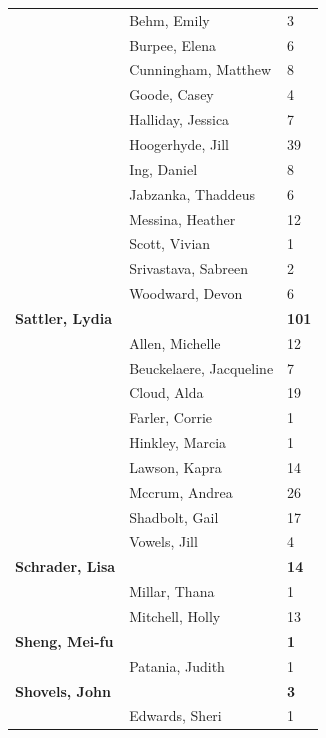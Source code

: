 \documentclass{article}\usepackage[]{graphicx}\usepackage[]{color}
\begin{document}
{\begin{longtable} { >{\raggedright}p{}|p{}p{}}
   \rowcolor[gray]{0.90} & Behm, Emily & 3 \\ 
   \rowcolor[gray]{0.90} & Burpee, Elena & 6 \\ 
   \rowcolor[gray]{0.90} & Cunningham, Matthew & 8 \\ 
   & Goode, Casey & 4 \\ 
   & Halliday, Jessica & 7 \\ 
   & Hoogerhyde, Jill & 39 \\ 
   \rowcolor[gray]{0.90} & Ing, Daniel & 8 \\ 
   \rowcolor[gray]{0.90} & Jabzanka, Thaddeus & 6 \\ 
   \rowcolor[gray]{0.90} & Messina, Heather & 12 \\ 
   & Scott, Vivian & 1 \\ 
   & Srivastava, Sabreen & 2 \\ 
   & Woodward, Devon & 6 \\ 
   \rowcolor[gray]{0.90}\textbf{Sattler, Lydia} &  & \hspace{2cm}\textbf{101} \\ 
   \rowcolor[gray]{0.90} & Allen, Michelle & 12 \\ 
   \rowcolor[gray]{0.90} & Beuckelaere, Jacqueline & 7 \\ 
   & Cloud, Alda & 19 \\ 
   & Farler, Corrie & 1 \\ 
   & Hinkley, Marcia & 1 \\ 
   \rowcolor[gray]{0.90} & Lawson, Kapra & 14 \\ 
   \rowcolor[gray]{0.90} & Mccrum, Andrea & 26 \\ 
   \rowcolor[gray]{0.90} & Shadbolt, Gail & 17 \\ 
   & Vowels, Jill & 4 \\ 
  \textbf{Schrader, Lisa} &  & \hspace{2cm}\textbf{14} \\ 
   & Millar, Thana & 1 \\ 
   \rowcolor[gray]{0.90} & Mitchell, Holly & 13 \\ 
   \rowcolor[gray]{0.90}\textbf{Sheng, Mei-fu} &  & \hspace{2cm}\textbf{1} \\ 
   \rowcolor[gray]{0.90} & Patania, Judith & 1 \\ 
  \textbf{Shovels, John} &  & \hspace{2cm}\textbf{3} \\ 
   & Edwards, Sheri & 1 \\ 

\end{longtable}}
\end{document}
